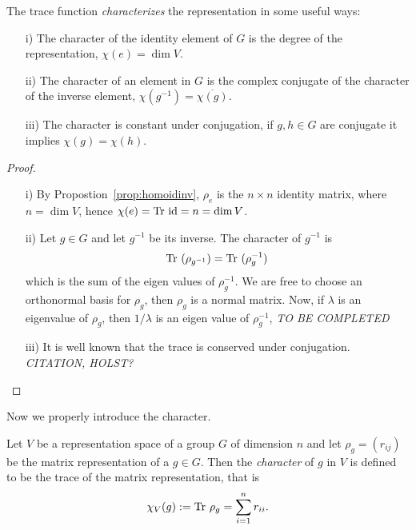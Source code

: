 \begin{proposition}\cite[Prop.2.1.]{Serre}\label{prop:charidinvconj}
	The trace function \emph{characterizes} the representation in some useful ways:
	\begin{enumerate}
		\item[i)] The character of the identity element of $G$ is the degree of the representation, $\chi(e) = \dim V$.
		\item[ii)] The character of an element in $G$ is the complex conjugate of the character of the inverse element, $\chi(g^{-1}) = \overline{\chi(g)}$.
		\item[iii)] The character is constant under conjugation, if $g,h\in G$ are conjugate it implies $\chi(g) = \chi(h)$.
	\end{enumerate}
\end{proposition}
\begin{proof}
	\begin{enumerate}
		\item[i)] By Propostion~\ref{prop:homoidinv}, $\rho_e$ is the $n \times n$ identity matrix, where $n = \dim V$, hence $\chi(e) = \text{Tr } \text{id} = n = \dim V$.
		\item[ii)] Let $g \in G$ and let $g^{-1}$ be its inverse. The character of $g^{-1}$ is 
		\begin{align*}
			\text{Tr }(\rho_{g^{-1}}) = \text{Tr }(\rho_g^{-1})
		\end{align*}
		which is the sum of the eigen values of $\rho_g^{-1}$. We are free to choose an orthonormal basis for $\rho_g$, then $\rho_g$ is a normal matrix. Now, if $\lambda$ is an eigenvalue of $\rho_g$, then $1/\lambda$ is an eigen value of $\rho_g^{-1}$, \textit{TO BE COMPLETED}

		\item[iii)] It is well known that the trace is conserved under conjugation. \textit{CITATION, HOLST?} \qedhere
	\end{enumerate}
\end{proof}

Now we properly introduce the character.

\begin{definition}\label{def:char}
	Let $V$ be a representation space of a group $G$ of dimension $n$ and let $\rho_g = (r_{ij})$ be the matrix representation of a $g \in G$. Then the \emph{character} of $g$ in $V$ is defined to be the trace of the matrix representation, that is 
	\begin{align*}
		\chi_V(g) := \text{Tr } \rho_g = \sum_{i=1}^{n} r_{ii}.
	\end{align*}
\end{definition}


